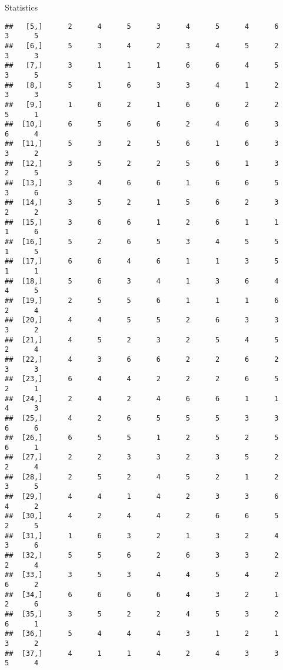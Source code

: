 \documentclass[
  ignorenonframetext,
]{beamer}
\begin{document}
\begin{frame}[fragile]{Statistics}
\begin{verbatim}
##   [5,]      2      4      5      3      4      5      4      6      3      5
##   [6,]      5      3      4      2      3      4      5      2      3      3
##   [7,]      3      1      1      1      6      6      4      5      3      5
##   [8,]      5      1      6      3      3      4      1      2      3      3
##   [9,]      1      6      2      1      6      6      2      2      5      1
##  [10,]      6      5      6      6      2      4      6      3      6      4
##  [11,]      5      3      2      5      6      1      6      3      3      2
##  [12,]      3      5      2      2      5      6      1      3      2      5
##  [13,]      3      4      6      6      1      6      6      5      3      6
##  [14,]      3      5      2      1      5      6      2      3      2      2
##  [15,]      3      6      6      1      2      6      1      1      1      6
##  [16,]      5      2      6      5      3      4      5      5      1      5
##  [17,]      6      6      4      6      1      1      3      5      1      1
##  [18,]      5      6      3      4      1      3      6      4      4      5
##  [19,]      2      5      5      6      1      1      1      6      2      4
##  [20,]      4      4      5      5      2      6      3      3      3      2
##  [21,]      4      5      2      3      2      5      4      5      2      4
##  [22,]      4      3      6      6      2      2      6      2      3      3
##  [23,]      6      4      4      2      2      2      6      5      2      1
##  [24,]      2      4      2      4      6      6      1      1      4      3
##  [25,]      4      2      6      5      5      5      3      3      6      6
##  [26,]      6      5      5      1      2      5      2      5      6      1
##  [27,]      2      2      3      3      2      3      5      2      2      4
##  [28,]      2      5      2      4      5      2      1      2      3      5
##  [29,]      4      4      1      4      2      3      3      6      4      2
##  [30,]      4      2      4      4      2      6      6      5      2      5
##  [31,]      1      6      3      2      1      3      2      4      3      6
##  [32,]      5      5      6      2      6      3      3      2      2      4
##  [33,]      3      5      3      4      4      5      4      2      6      2
##  [34,]      6      6      6      6      4      3      2      1      2      6
##  [35,]      3      5      2      2      4      5      3      2      6      1
##  [36,]      5      4      4      4      3      1      2      1      3      2
##  [37,]      4      1      1      4      2      4      3      3      5      4

\end{verbatim}
\end{frame}
\end{document}
